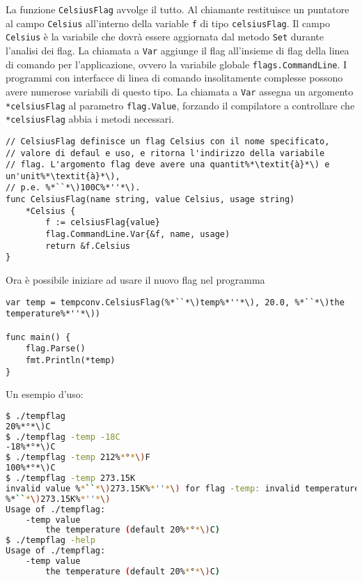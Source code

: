 La funzione \verb|CelsiusFlag| avvolge il tutto.
Al chiamante restituisce un puntatore al campo \verb|Celsius| all'interno della variable \verb|f| di tipo \verb|celsiusFlag|.
Il campo \verb|Celsius| è la variabile che dovrà essere aggiornata dal metodo \verb|Set| durante l'analisi dei flag.
La chiamata a \verb|Var| aggiunge il flag all'insieme di flag della linea di comando per l'applicazione, ovvero la variabile globale \verb|flags.CommandLine|.
I programmi con interfacce di linea di comando insolitamente complesse possono avere numerose variabili di questo tipo.
La chiamata a \verb|Var| assegna un argomento \verb|*celsiusFlag| al parametro \verb|flag.Value|, forzando il compilatore a controllare che \verb|*celsiusFlag| abbia i metodi necessari.
\begin{lstlisting}[frame=single, label={lst:lstlisting6-4.6}]
// CelsiusFlag definisce un flag Celsius con il nome specificato,
// valore di defaul e uso, e ritorna l'indirizzo della variabile
// flag. L'argomento flag deve avere una quantit%*\textit{à}*\) e un'unit%*\textit{à}*\),
// p.e. %*``*\)100C%*''*\).
func CelsiusFlag(name string, value Celsius, usage string)
    *Celsius {
        f := celsiusFlag{value}
        flag.CommandLine.Var{&f, name, usage)
        return &f.Celsius
}
\end{lstlisting}
Ora è possibile iniziare ad usare il nuovo flag nel programma
\begin{lstlisting}[frame=single, label={lst:lstlisting6-4.7}]
var temp = tempconv.CelsiusFlag(%*``*\)temp%*''*\), 20.0, %*``*\)the temperature%*''*\))

func main() {
    flag.Parse()
    fmt.Println(*temp)
}
\end{lstlisting}
Un esempio d'uso:
\begin{lstlisting}[language=bash, frame=L, label={lst:lstlisting6-4.8}]
$ ./tempflag
20%*°*\)C
$ ./tempflag -temp -18C
-18%*°*\)C
$ ./tempflag -temp 212%*°*\)F
100%*°*\)C
$ ./tempflag -temp 273.15K
invalid value %*``*\)273.15K%*''*\) for flag -temp: invalid temperature
%*``*\)273.15K%*''*\)
Usage of ./tempflag:
    -temp value
        the temperature (default 20%*°*\)C)
$ ./tempflag -help
Usage of ./tempflag:
    -temp value
        the temperature (default 20%*°*\)C)
\end{lstlisting}